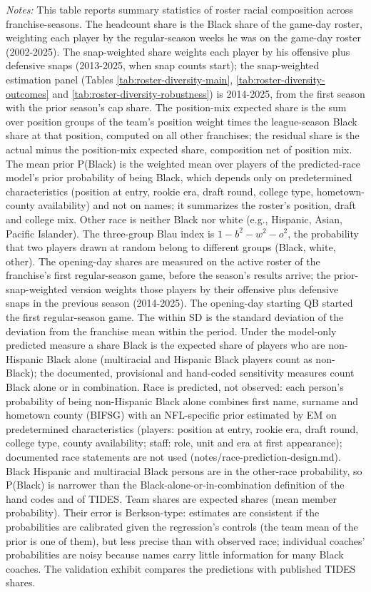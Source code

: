 {\footnotesize
\noindent\textit{Notes:} This table reports summary statistics of roster racial composition across franchise-seasons. The headcount share is the Black share of the game-day roster, weighting each player by the regular-season weeks he was on the game-day roster (2002-2025). The snap-weighted share weights each player by his offensive plus defensive snaps (2013-2025, when snap counts start); the snap-weighted estimation panel (Tables \ref{tab:roster-diversity-main},  \ref{tab:roster-diversity-outcomes} and \ref{tab:roster-diversity-robustness})  is 2014-2025, from the first season with the prior season's cap share. The position-mix expected share is the sum over position groups of the team's position weight times the league-season Black share at that position, computed on all other franchises; the residual share is the actual minus the position-mix expected share, composition net of position mix. The mean prior P(Black) is the weighted mean over players of the predicted-race model's prior probability of being Black, which depends only on predetermined characteristics (position at entry, rookie era, draft round, college type, hometown-county availability) and not on names; it summarizes the roster's position, draft and college mix. Other race is neither Black nor white (e.g., Hispanic, Asian, Pacific Islander). The three-group Blau index is $1 - b^2 - w^2 - o^2$, the probability that two players drawn at random belong to different groups (Black, white, other). The opening-day shares are measured on the active roster of the franchise's first regular-season game, before the season's results arrive; the prior-snap-weighted version weights those players by their offensive plus defensive snaps in the previous season (2014-2025). The opening-day starting QB started the first regular-season game. The within SD is the standard deviation of the deviation from the franchise mean within the period. Under the model-only predicted measure a share Black is the expected share of players who are non-Hispanic Black alone (multiracial and Hispanic Black players count as non-Black); the documented, provisional and hand-coded sensitivity measures count Black alone or in combination. Race is predicted, not observed: each person's probability of being non-Hispanic Black alone combines first name, surname and hometown county (BIFSG) with an NFL-specific prior estimated by EM on predetermined characteristics (players: position at entry, rookie era, draft round, college type, county availability; staff: role, unit and era at first appearance); documented race statements are not used (notes/race-prediction-design.md). Black Hispanic and multiracial Black persons are in the other-race probability, so P(Black) is narrower than the Black-alone-or-in-combination definition of the hand codes and of TIDES. Team shares are expected shares (mean member probability). Their error is Berkson-type: estimates are consistent if the probabilities are calibrated given the regression's controls (the team mean of the prior is one of them), but less precise than with observed race; individual coaches' probabilities are noisy because names carry little information for many Black coaches. The validation exhibit compares the predictions with published TIDES shares.
\par}

